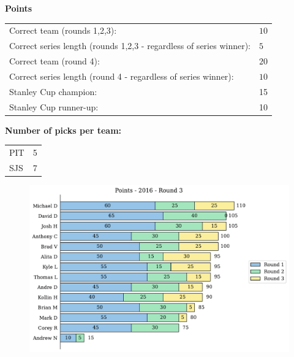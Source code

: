 \documentclass[10pt]{article}
\begin{document}
{\bf Points}\\
\begin{minipage}{12cm}
    \begin{tabular}{l l}
        Correct team (rounds 1,2,3):	& $10$\\
        Correct series length (rounds 1,2,3 - regardless of series winner):	& $5$\\
        Correct team (round 4):	& $20$\\
        Correct series length (round 4 - regardless of series winner):	& $10$\\
        Stanley Cup champion:	& 15\\
        Stanley Cup runner-up:	& 10\\
    \end{tabular}

    \vspace{1cm}
    {\bf Number of picks per team:}\\
    \begin{tabular}{lc }
        PIT & 5 \\
        SJS & 7 \\
    \end{tabular}
\end{minipage}
\begin{minipage}[t]{13cm}
    \begin{figure}[H]
        \vspace{-3cm}
        \includegraphics[width=13cm]{../../figures/2016/Points-2016-Round3.pdf}
    \end{figure}
\end{minipage}
\end{document}
